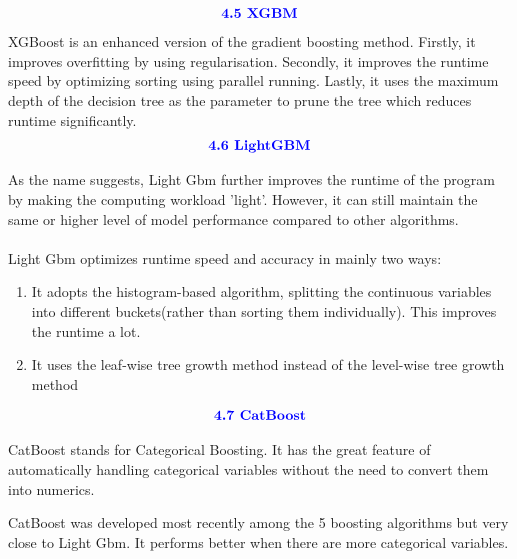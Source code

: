\documentclass{homework}
\begin{document}
 \begin{align*}
    \textcolor{blue}{ \text{{\textbf{4.5 XGBM}}}}
 \end{align*}
 XGBoost is an enhanced version of the gradient boosting method. Firstly, it improves overfitting by using regularisation. Secondly, it improves the runtime speed by optimizing sorting using parallel running. Lastly, it uses the maximum depth of the decision tree as the parameter to prune the tree which reduces runtime significantly.
 \begin{align*}
    \textcolor{blue}{ \text{{\textbf{4.6 LightGBM}}}}
 \end{align*}

 As the name suggests, Light Gbm further improves the runtime of the program by making the computing workload 'light'. However, it can still maintain the same or higher level of model performance compared to other algorithms. \\
\\
Light Gbm optimizes runtime speed and accuracy in mainly two ways:
\begin{enumerate}
    \item It adopts the histogram-based algorithm, splitting the continuous variables into different buckets(rather than sorting them individually). This improves the runtime a lot.
    \item It uses the leaf-wise tree growth method instead of the level-wise tree growth method
\end{enumerate}

\begin{align*}
    \textcolor{blue}{ \text{{\textbf{4.7 CatBoost}}}}
 \end{align*}

 CatBoost stands for Categorical Boosting. It has the great feature of automatically handling categorical variables without the need to convert them into numerics.

CatBoost was developed most recently among the 5 boosting algorithms but very close to Light Gbm. It performs better when there are more categorical variables.
\end{document}
